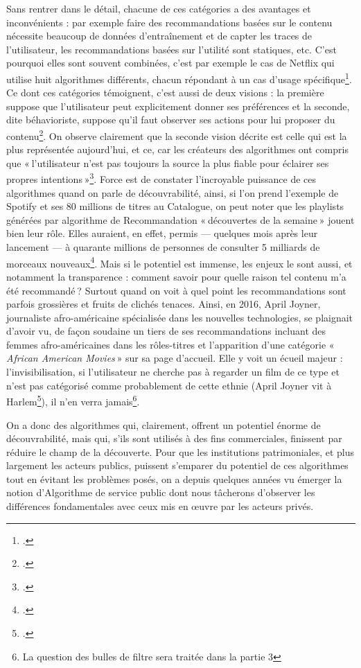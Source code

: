 Sans rentrer dans le détail, chacune de ces catégories a des avantages et inconvénients : par exemple faire des recommandations basées sur le contenu nécessite beaucoup de données d’entraînement et de capter les traces de l’utilisateur, les recommandations basées sur l’utilité sont statiques, etc. C’est pourquoi elles sont souvent combinées, c’est par exemple le cas de Netflix qui utilise huit algorithmes différents, chacun répondant à un cas d’usage spécifique\footcite[p. 47]{claes2022}. Ce dont ces catégories témoignent, c’est aussi de deux visions : la première suppose que l’utilisateur peut explicitement donner ses préférences et la seconde, dite béhavioriste, suppose qu’il faut observer ses actions pour lui proposer du contenu\footcite[p. 38]{claes2022}. On observe clairement que la seconde vision décrite est celle qui est la plus représentée aujourd’hui, et ce, car les créateurs des algorithmes ont compris que « l’utilisateur n’est pas toujours la source la plus fiable pour éclairer ses propres intentions »\footcite[p. 39]{claes2022}. Force est de constater l’incroyable puissance de ces algorithmes quand on parle de découvrabilité, ainsi, si l’on prend l’exemple de Spotify et ses 80 millions de titres au Catalogue, on peut noter que les playlists générées par algorithme de Recommandation « découvertes de la semaine » jouent bien leur rôle. Elles auraient, en effet, permis — quelques mois après leur lancement — à quarante millions de personnes de consulter 5 milliards de morceaux nouveaux\footcite[§ 2]{durand_chapitre_2016-1}. Mais si le potentiel est immense, les enjeux le sont aussi, et notamment la transparence : comment savoir pour quelle raison tel contenu m’a été recommandé ? Surtout quand on voit à quel point les recommandations sont parfois grossières et fruits de clichés tenaces. Ainsi, en 2016, April Joyner, journaliste afro-américaine spécialisée dans les nouvelles technologies, se plaignait d’avoir vu, de façon soudaine un tiers de ses recommandations incluant des femmes afro-américaines dans les rôles-titres et l’apparition d’une catégorie « \textit{African American Movies} » sur sa page d’accueil. Elle y voit un écueil majeur : l’invisibilisation, si l’utilisateur ne cherche pas à regarder un film de ce type et n’est pas catégorisé comme probablement de cette ethnie (April Joyner vit à Harlem\footcite{2017}), il n’en verra jamais\footnote{La question des bulles de filtre sera traitée dans la partie 3}.

On a donc des algorithmes qui, clairement, offrent un potentiel énorme de découvrabilité, mais qui, s’ils sont utilisés à des fins commerciales, finissent par réduire le champ de la découverte. Pour que les institutions patrimoniales, et plus largement les acteurs publics, puissent s’emparer du potentiel de ces algorithmes tout en évitant les problèmes posés, on a depuis quelques années vu émerger la notion d’Algorithme de service public dont nous tâcherons d’observer les différences fondamentales avec ceux mis en œuvre par les acteurs privés.



